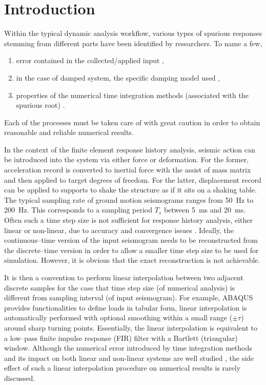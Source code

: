 \section{Introduction}
Within the typical dynamic analysis workflow, various types of spurious responses stemming from different parts have been identified by researchers. To name a few,
\begin{enumerate}
\item error contained in the collected/applied input \citep{Shing1987},
\item in the case of damped system, the specific damping model used \citep{Hall2006,Jehel2014,Chopra2015},
\item properties of the numerical time integration methods (associated with the spurious root) \citep{Hulbert1994}.
\end{enumerate}
Each of the processes must be taken care of with great caution in order to obtain reasonable and reliable numerical results.

In the context of the finite element response history analysis, seismic action can be introduced into the system via either force or deformation. For the former, acceleration record is converted to inertial force with the assist of mass matrix and then applied to target degrees of freedom. For the latter, displacement record can be applied to supports to shake the structure as if it sits on a shaking table.
The typical sampling rate of ground motion seismograms ranges from \SI{50}{\hertz} to \SI{200}{\hertz}. This corresponds to a sampling period $T_s$ between \SI{5}{\milli\second} and \SI{20}{\milli\second}. Often such a time step size is not sufficient for response history analysis, either linear or non-linear, due to accuracy and convergence issues \citep[see, e.g.,][]{Chang2011,Rossi2014}. Ideally, the continuous--time version of the input seismogram needs to be reconstructed from the discrete--time version in order to allow a smaller time step size to be used for simulation. However, it is obvious that the exact reconstruction is not achievable.

It is then a convention to perform linear interpolation between two adjacent discrete samples for the case that time step size (of numerical analysis) is different from sampling interval (of input seismogram). For example, ABAQUS \citep[see][\S34.1.2]{ABAQUS2014} provides functionalities to define loads in tabular form, linear interpolation is automatically performed with optional smoothing within a small range ($\pm\tau$) around sharp turning points. Essentially, the linear interpolation is equivalent to a low--pass finite impulse response (FIR) filter with a Bartlett (triangular) window. Although the numerical error introduced by time integration methods and its impact on both linear and non-linear systems are well studied \citep[see, e.g.,][]{Chang2003,Chang2005}, the side effect of such a linear interpolation procedure on numerical results is rarely discussed.

